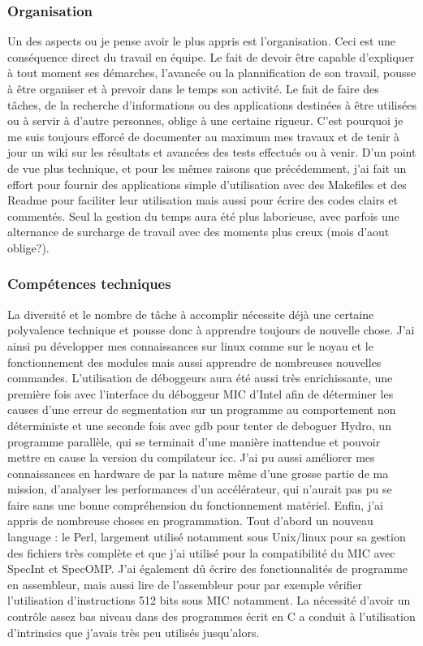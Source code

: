 \documentclass{article}
\begin{document}
			\subsubsection{Organisation}
			Un des aspects ou je pense avoir le plus appris est l'organisation. Ceci est une conséquence direct du travail 
			en équipe. Le fait de devoir être capable d'expliquer à tout moment ses démarches, l'avancée ou la plannification 
			de son travail, pousse à être organiser et à prevoir dans le temps son activité. Le fait de faire des tâches, de la 
			recherche d'informations ou des applications destinées à être utilisées ou à servir à d'autre personnes, oblige à une 
			certaine rigueur. C'est pourquoi je me suis toujours efforcé de documenter au maximum mes travaux et de tenir à jour 
			un wiki sur les résultats et avancées des tests effectués ou à venir. \newline
			D'un point de vue plus technique, et pour les mêmes raisons que précédemment, j'ai fait un effort pour fournir 
			des applications simple d'utilisation avec des Makefiles et des Readme pour faciliter leur utilisation mais aussi 
			pour écrire des codes clairs et commentés. \newline
			Seul la gestion du temps aura été plus laborieuse, avec parfois une alternance de surcharge de travail avec des moments 
			plus creux (mois d'aout oblige?).
			\subsubsection{Compétences techniques}
			La diversité et le nombre de tâche à accomplir nécessite déjà une certaine polyvalence technique et pousse donc à 
			apprendre toujours de nouvelle chose. J'ai ainsi pu développer mes connaissances sur linux comme sur le noyau et 
			le fonctionnement des modules mais aussi apprendre de nombreuses nouvelles commandes. \newline
			L'utilisation de déboggeurs aura été aussi très enrichissante, une première fois avec l'interface du déboggeur 
			MIC d'Intel afin de déterminer les causes d'une erreur de segmentation sur un programme au comportement non 
			déterministe et une seconde fois avec gdb pour tenter de deboguer Hydro, un programme parallèle, qui se terminait 
			d'une manière inattendue et pouvoir mettre en cause la version du compilateur icc. \newline
			J'ai pu aussi améliorer mes connaissances en hardware de par la nature même d'une grosse partie de ma mission, d'analyser 
			les performances d'un accélérateur, qui n'aurait pas pu se faire sans une bonne compréhension du fonctionnement matériel. \newline
			Enfin, j'ai appris de nombreuse choses en programmation. Tout d'abord un nouveau language : le Perl, largement utilisé 
			notamment sous Unix/linux pour sa gestion des fichiers très complète et que j'ai utilisé pour la compatibilité du MIC 
			avec SpecInt et SpecOMP. J'ai également dû écrire des fonctionnalités de programme en assembleur, mais aussi lire 
			de l'assembleur pour par exemple vérifier l'utilisation d'instructions 512 bits sous MIC notamment. La nécessité 
			d'avoir un contrôle assez bas niveau dans des programmes écrit en C a conduit à l'utilisation d'intrinsics que j'avais 
			très peu utilisés jusqu'alors.
\end{document}
